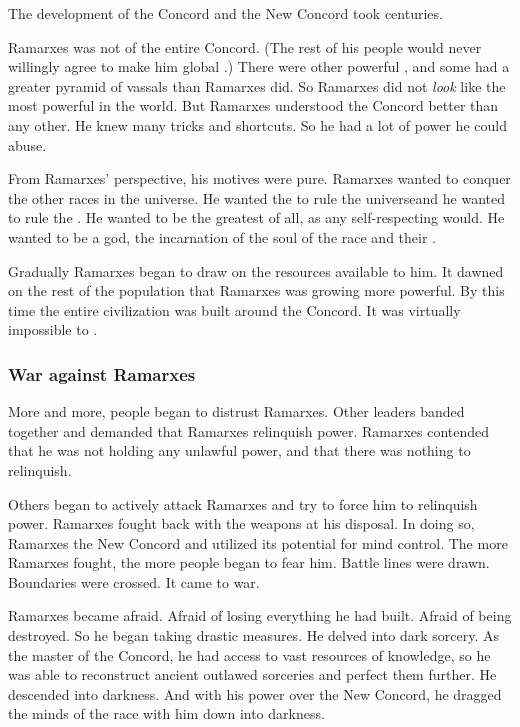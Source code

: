The development of the Concord and the New Concord took centuries. 

Ramarxes was not \apex of the entire Concord. 
(The rest of his people would never willingly agree to make him global \apex.)
There were other powerful \apexes, and some had a greater pyramid of vassals than Ramarxes did. 
So Ramarxes did not \emph{look} like the most powerful \caisith in the world.
But Ramarxes understood the Concord better than any other.
He knew many tricks and shortcuts.
So he had a lot of power he could abuse. 

From Ramarxes' perspective, his motives were pure. 
Ramarxes wanted to conquer the other races in the universe. 
He wanted the \caisith to rule the universe\dash and he wanted to rule the \caisith.
He wanted to be the greatest of all, as any self-respecting \caisith would. 
He wanted to be a god, the incarnation of the soul of the \caisith race and their . 

Gradually Ramarxes began to draw on the resources available to him.
It dawned on the rest of the population that Ramarxes was growing more powerful.
By this time the entire \caisith civilization was built around the Concord.
It was virtually impossible to . 





\subsubsection{War against Ramarxes}
More and more, people began to distrust Ramarxes. 
Other leaders banded together and demanded that Ramarxes relinquish power.
Ramarxes contended that he was not holding any unlawful power, and that there was nothing to relinquish.

Others began to actively attack Ramarxes and try to force him to relinquish power.
Ramarxes fought back with the weapons at his disposal. 
In doing so, Ramarxes  the New Concord and utilized its potential for mind control. 
The more Ramarxes fought, the more people began to fear him.
Battle lines were drawn. 
Boundaries were crossed.
It came to war. 

Ramarxes became afraid. 
Afraid of losing everything he had built.
Afraid of being destroyed. 
So he began taking drastic measures.
He delved into dark sorcery. 
As the master of the Concord, he had access to vast resources of knowledge, so he was able to reconstruct ancient outlawed sorceries and perfect them further. 
He descended into darkness. 
And with his power over the New Concord, he dragged the minds of the \caisith race with him down into darkness. 

